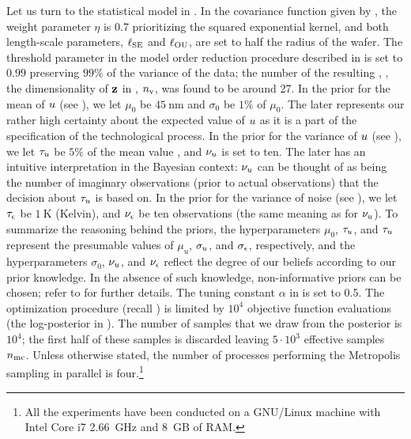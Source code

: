 Let us turn to the statistical model in . In the covariance function given by , the weight parameter $\eta$ is 0.7 prioritizing the squared exponential kernel, and both length-scale parameters, $\ell_{\text{SE}}$ and $\ell_{\text{OU}}$, are set to half the radius of the wafer. The threshold parameter in the model order reduction procedure described in  is set to $0.99$ preserving $99\%$ of the variance of the data; the number of the resulting \rvs, \ie, the dimensionality of $\mathbf{z}$ in , ${n_\text{v}}$, was found to be around 27. In the prior for the mean of $u$ (see ), we let $\mu_0$ be $45~\text{nm}$ and $\sigma_0$ be $1\%$ of $\mu_0$. The later represents our rather high certainty about the expected value of $u$ as it is a part of the specification of the technological process. In the prior for the variance of $u$ (see ), we let $\tau_u$ be $5\%$ of the mean value \cite{juan2011, juan2012}, and $\nu_u$ is set to ten. The later has an intuitive interpretation in the Bayesian context: $\nu_u$ can be thought of as being the number of imaginary observations (prior to actual observations) that the decision about $\tau_u$ is based on. In the prior for the variance of noise (see ), we let $\tau_\epsilon$ be $1~\text{K}$ (Kelvin), and $\nu_\epsilon$ be ten observations (the same meaning as for $\nu_u$). To summarize the reasoning behind the priors, the hyperparameters $\mu_0$, $\tau_u$, and $\tau_u$ represent the presumable values of $\mu_u$, $\sigma_u$, and $\sigma_\epsilon$, respectively, and the hyperparameters $\sigma_0$, $\nu_u$, and $\nu_\epsilon$ reflect the degree of our beliefs according to our prior knowledge. In the absence of such knowledge, non-informative priors can be chosen; refer to \cite{gelman2004} for further details. The tuning constant $\alpha$ in  is set to 0.5. The optimization procedure (recall ) is limited by $10^4$ objective function evaluations (the log-posterior in ). The number of samples that we draw from the posterior is $10^4$; the first half of these samples is discarded leaving $5 \cdot 10^3$ effective samples ${n_\text{mc}}$. Unless otherwise stated, the number of processes performing the Metropolis sampling in parallel is four.\footnote{All the experiments have been conducted on a GNU/Linux machine with Intel Core i7 2.66~GHz and 8~GB of RAM.}

